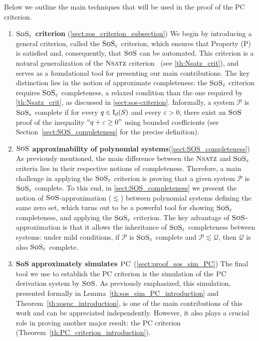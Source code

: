 \documentclass[11pt]{article}
\newcommand{\sos}{\text{\sc{SoS}}}
\newcommand{\PC}{\textsc{PC}}
\newcommand{\Nsatz}{\textsc{Nsatz}}
\newcommand{\I}{\emph{$\rm{I}$}}
\newcommand{\1}{\textbf{1}}
\begin{document}
Below we outline the main techniques that will be used in the proof of the PC criterion. 

\begin{enumerate}
    \item \textbf{$\sos_\varepsilon$ criterion} (\cref{sect:sos_criterion_subsection}) We begin by introducing a general criterion, called the $\sos_\varepsilon$ criterion, which ensures that Property (\textsc P) is satisfied and, consequently, that $\sos$ can be automated. This criterion is a natural generalization of the $\Nsatz$ criterion~\cite{raghavendra_weitz2017} (see \cref{th:Nsatz_crit}), and serves as a foundational tool for presenting our main contributions. The key distinction lies in the notion of approximate completeness: the $\sos_\varepsilon$ criterion requires $\sos_\varepsilon$ completeness, a relaxed condition than the one required by \cref{th:Nsatz_crit}, as discussed in \cref{sect:sos-criterion}.
Informally, a system $\mathcal{P}$ is $\sos_\varepsilon$ complete if for every $q \in \I_d(S)$ and every $\varepsilon > 0$, there exist an $\sos$ proof of the inequality $``q + \varepsilon \geq 0"$ using bounded coefficients (see Section~\ref{sect:SOS_completeness} for the precise definition).
    \item \textbf{$\sos$ approximability of polynomial systems}(\cref{sect:SOS_completeness}) As previously mentioned, the main difference between the $\Nsatz$ and $\sos_\varepsilon$ criteria lies in their respective notions of completeness. Therefore, a main challenge in applying the $\sos_\varepsilon$ criterion is proving that a given system $\mathcal{P}$ is $\sos_\varepsilon$ complete. To this end, in \cref{sect:SOS_completeness} we present the notion of $\sos$-approximation ($\lesssim$) between polynomial systems defining the same zero set, which turns out to be a powerful tool for showing $\sos_\varepsilon$ completeness, and applying the $\sos_\varepsilon$ criterion.
The key advantage of $\sos$-approximation is that it allows the inheritance of $\sos_\varepsilon$ completeness between systems: under mild conditions, if $\mathcal{P}$ is $\sos_\varepsilon$ complete and $\mathcal{P} \lesssim \mathcal{Q}$, then $\mathcal{Q}$ is also $\sos_\varepsilon$ complete.
    \item {\textbf{SoS approximately simulates $\PC$}} (\cref{sect:proof_sos_sim_PC}) The final tool we use to establish the PC criterion is the simulation of the $\PC$ derivation system by $\sos$. As previously emphasized, this simulation, presented formally in Lemma~\ref{th:sos_sim_PC_introduction} and Theorem~\ref{th:sospc_introduction}, is one of the main contributions of this work and can be appreciated independently. However, it also plays a crucial role in proving another major result: the PC criterion (Theorem~\ref{th:PC_criterion_introduction}).

\end{enumerate}
\end{document}
